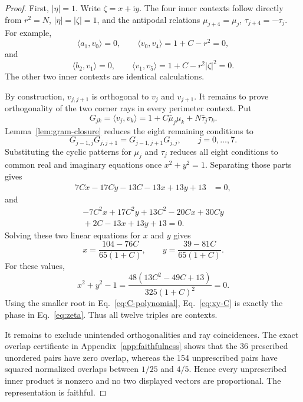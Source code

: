 \documentclass[12pt,a4paper]{article}
\theoremstyle{definition}
\theoremstyle{remark}
\newcommand{\ii}{\mathrm{i}}
\begin{document}
\begin{proof}
First, $|\eta|=1$.  Write $\zeta=x+\ii y$.  The four inner contexts
follow directly from $r^2=N$, $|\eta|=|\zeta|=1$, and the antipodal
relations $\mu_{j+4}=\mu_j$, $\tau_{j+4}=-\tau_j$.  For example,
\[
 \langle a_1,v_0\rangle=0,\qquad
 \langle v_0,v_4\rangle=1+C-r^2=0,
\]
and
\[
 \langle b_2,v_1\rangle=0,\qquad
 \langle v_1,v_5\rangle=1+C-r^2|\zeta|^2=0.
\]
The other two inner contexts are identical calculations.

By construction, $v_{j,j+1}$ is orthogonal to $v_j$ and $v_{j+1}$.
It remains to prove orthogonality of the two corner rays in every
perimeter context.  Put
\[
 G_{jk}=\langle v_j,v_k\rangle
 =1+C\bar\mu_j\mu_k+N\bar\tau_j\tau_k.
\]
Lemma~\ref{lem:gram-closure} reduces the eight remaining conditions to
\begin{equation}
 G_{j-1,j}G_{j,j+1}=G_{j-1,j+1}G_{j,j},
 \qquad j=0,\ldots,7.
 \label{eq:h20-closure}
\end{equation}
Substituting the cyclic patterns for $\mu_j$ and $\tau_j$ reduces all eight
conditions to common real and imaginary equations once $x^2+y^2=1$.
Separating those parts gives
\begin{align}
 7Cx-17Cy-13C-13x+13y+13&=0,
 \label{eq:closure-real}
\end{align}
and
\begin{multline}
 -7C^2x+17C^2y+13C^2-20Cx+30Cy\\
 {}+2C-13x+13y+13=0.
 \label{eq:closure-imag}
\end{multline}
Solving these two linear equations for $x$ and $y$ gives
\begin{equation}
 x=\frac{104-76C}{65(1+C)},\qquad
 y=\frac{39-81C}{65(1+C)}.
 \label{eq:xy-C}
\end{equation}
For these values,
\begin{equation}
 x^2+y^2-1=
 \frac{48(13C^2-49C+13)}{325(1+C)^2}=0.
 \label{eq:zeta-unit}
\end{equation}
Using the smaller root in Eq.~\eqref{eq:C-polynomial},
Eq.~\eqref{eq:xy-C} is exactly the phase in Eq.~\eqref{eq:zeta}.
Thus all twelve triples are contexts.

It remains to exclude unintended orthogonalities and ray coincidences.
The exact overlap certificate in Appendix~\ref{app:faithfulness} shows
that the 36 prescribed unordered pairs have zero overlap, whereas the
154 unprescribed pairs have squared normalized overlaps between $1/25$
and $4/5$.  Hence every unprescribed inner product is nonzero and no two
displayed vectors are proportional.  The representation is faithful.
\end{proof}
\end{document}
